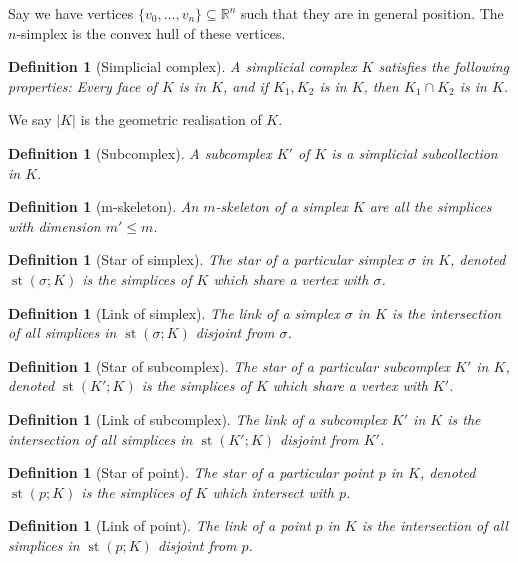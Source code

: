 \documentclass{article}
\newtheorem{definition}[theorem]{Definition}
\theoremstyle{definition}
\numberwithin{theorem}{section}
\numberwithin{equation}{section}
\DeclareMathOperator{\Star}{st}
\begin{document}
Say we have vertices $\{v_0, \ldots , v_n\} \subseteq \mathbb{R}^n$ such that they are in general position. The $n$-simplex is the convex hull of these vertices. 

\begin{definition}
    [Simplicial complex]
    A simplicial complex $K$ satisfies the following properties: Every face of $K$ is in $K$, and if $K_1, K_2$ is in $K$, then $K_1 \cap K_2$ is in $K$. 
\end{definition}
We say $|K|$ is the geometric realisation of $K$.

\begin{definition}
    [Subcomplex]
    A subcomplex $K'$ of $K$ is a simplicial subcollection in $K$.
\end{definition}

\begin{definition}
    [m-skeleton]
    An $m$-skeleton of a simplex $K$ are all the simplices with dimension $m' \leq m$. 
\end{definition}

\begin{definition}[Star of simplex]
    The star of a particular simplex $\sigma$ in $K$, denoted $\Star(\sigma; K)$ is the simplices of $K$ which share a vertex with $\sigma$. 
\end{definition}
\begin{definition}
    [Link of simplex]
    The link of a simplex $\sigma$ in $K$ is the intersection of all simplices in $\Star(\sigma; K)$ disjoint from $\sigma$.
\end{definition} 

\begin{definition}[Star of subcomplex]
    The star of a particular subcomplex $K'$ in $K$, denoted $\Star(K'; K)$ is the simplices of $K$ which share a vertex with $K'$. 
\end{definition}
\begin{definition}
    [Link of subcomplex]
    The link of a subcomplex $K'$ in $K$ is the intersection of all simplices in $\Star(K'; K)$ disjoint from $K'$.
\end{definition} 

\begin{definition}[Star of point]
    The star of a particular point $p$ in $K$, denoted $\Star(p; K)$ is the simplices of $K$ which intersect with $p$. 
\end{definition}
\begin{definition}
    [Link of point]
    The link of a point $p$ in $K$ is the intersection of all simplices in $\Star(p; K)$ disjoint from $p$.
\end{definition} 
\end{document}
